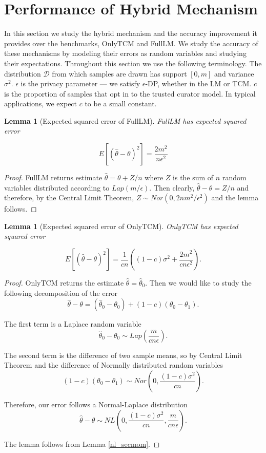 \documentclass[sigconf]{acmart}
\theoremstyle{plain}
\newtheorem{lem}[thm]{Lemma}
\begin{document}
\section{Performance of Hybrid Mechanism}

In this section we study the hybrid mechanism and the accuracy improvement it provides over the benchmarks, OnlyTCM and FullLM. We study the accuracy of these mechanisms by modeling their errors as random variables and studying their expectations. Throughout this section we use the following terminology. The distribution $\mathcal{D}$ from which samples are drawn has support $[0,m]$ and variance $\sigma^2$. $\epsilon$ is the privacy parameter — we satisfy $\epsilon$-DP, whether in the LM or TCM. $c$ is the proportion of samples that opt in to the trusted curator model. In typical applications, we expect $c$ to be a small constant. 

\begin{lem}[Expected squared error of FullLM]
\label{MSE_FullLM}
FullLM has expected squared error

$$E[(\hat{\theta} - \theta)^2] = \frac{2m^2}{n\epsilon^2}$$
\end{lem}

\begin{proof}
FullLM returns estimate $\hat{\theta} = \theta + Z/n$ where $Z$ is the sum of $n$ random variables distributed according to $Lap(m/\epsilon)$. Then clearly, $\hat{\theta} - \theta = Z/n$ and therefore, by the Central Limit Theorem, $Z \sim Nor(0, 2nm^2/\epsilon^2)$ and the lemma follows. 
\end{proof}

\begin{lem}[Expected squared error of OnlyTCM]
\label{MSE_OnlyTCM}
OnlyTCM has expected squared error

$$E[(\hat{\theta} - \theta)^2] = \frac{1}{cn}\left((1-c)\sigma^2 + \frac{2m^2}{cn \epsilon^2 }\right).$$
\end{lem}

\begin{proof}
OnlyTCM returns the estimate $\hat{\theta} = \hat{\theta}_0$. Then we would like to study the following decomposition of the error
$$\hat{\theta} - \theta = (\hat{\theta}_0 - \theta_0) + (1-c)(\theta_0 - \theta_1).$$

The first term is a Laplace random variable
$$\hat{\theta}_0 - \theta_0 \sim Lap\left(\frac{m}{cn\epsilon}\right).$$

The second term is the difference of two sample means, so by Central Limit Theorem and the difference of Normally distributed random variables
$$(1-c)(\theta_0 - \theta_1) \sim Nor\left(0, \frac{(1-c)\sigma^2}{cn}\right).$$

Therefore, our error follows a Normal-Laplace distribution
$$\hat{\theta} - \theta \sim NL\left(0, \frac{(1-c)\sigma^2}{cn}, \frac{m}{cn\epsilon} \right).$$

The lemma follows from Lemma \ref{nl_secmom}.
\end{proof}
\end{document}
